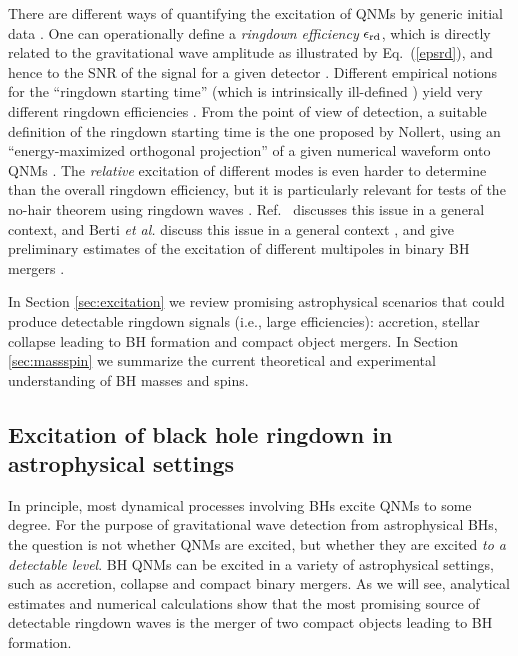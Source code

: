 \documentclass[]{iopart}
\begin{document}
There are different ways of quantifying the excitation of QNMs by generic
initial data
\cite{Leaver:1986gd,Sun:1988tz,Andersson:1995zk,Nollert:1998ys,Berti:2006wq}.
One can operationally define a {\em ringdown efficiency} $\epsilon_{\rm rd}$,
which is directly related to the gravitational wave amplitude as illustrated
by Eq.~(\ref{epsrd}), and hence to the SNR of the signal for a given detector
\cite{Flanagan:1997sx,Berti:2005ys}.  Different empirical notions for the
``ringdown starting time'' (which is intrinsically ill-defined
\cite{nollertthesis}) yield very different ringdown efficiencies
\cite{Dorband:2006gg,Berti:2007fi,Buonanno:2006ui}. From the point of view of
detection, a suitable definition of the ringdown starting time is the one
proposed by Nollert, using an ``energy-maximized orthogonal projection'' of a
given numerical waveform onto QNMs \cite{Berti:2007fi,Berti:2007zu}.  The {\em
  relative} excitation of different modes is even harder to determine than the
overall ringdown efficiency, but it is particularly relevant for tests of the
no-hair theorem using ringdown waves
\cite{Dreyer:2003bv,Berti:2005ys,Berti:2007zu}.  Ref.~\cite{Berti:2006hb}
discusses this issue in a general context, and Berti {\it et al.} discuss this
issue in a general context \cite{Berti:2006hb}, and give preliminary estimates
of the excitation of different multipoles in binary BH mergers
\cite{Berti:2007fi,Berti:2007nw}.

In Section \ref{sec:excitation} we review promising astrophysical scenarios
that could produce detectable ringdown signals (i.e., large efficiencies):
accretion, stellar collapse leading to BH formation and compact object
mergers. In Section \ref{sec:massspin} we summarize the current theoretical
and experimental understanding of BH masses and spins.

\subsection{\label{sec:excitation}Excitation of black hole ringdown in astrophysical settings} 

In principle, most dynamical processes involving BHs excite QNMs to some
degree. For the purpose of gravitational wave detection from astrophysical
BHs, the question is not whether QNMs are excited, but whether they are
excited {\em to a detectable level}. BH QNMs can be excited in a variety of
astrophysical settings, such as accretion, collapse and compact binary
mergers. As we will see, analytical estimates and numerical calculations show
that the most promising source of detectable ringdown waves is the merger of
two compact objects leading to BH formation.
\end{document}
